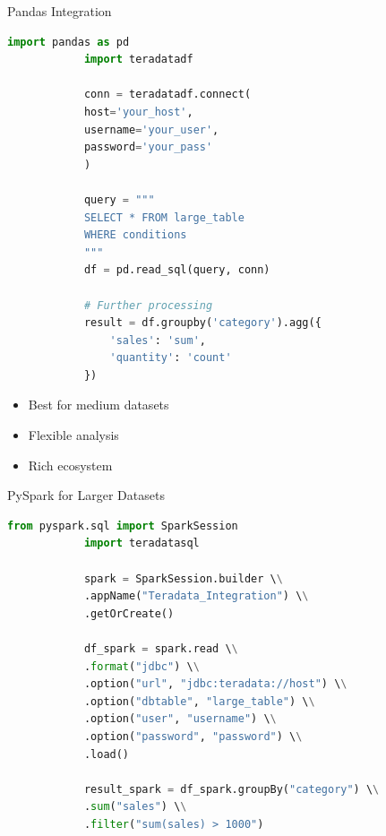 \documentclass{beamer}
\begin{document}
	\begin{frame}[fragile]{Pandas Integration}
		\begin{lstlisting}[language=Python, caption=Extracting to Pandas]
			import pandas as pd
			import teradatadf
			
			conn = teradatadf.connect(
			host='your_host',
			username='your_user',
			password='your_pass'
			)
			
			query = """
			SELECT * FROM large_table
			WHERE conditions
			"""
			df = pd.read_sql(query, conn)
			
			# Further processing
			result = df.groupby('category').agg({
				'sales': 'sum',
				'quantity': 'count'
			})
		\end{lstlisting}
		\begin{itemize}
			\item Best for medium datasets
			\item Flexible analysis
			\item Rich ecosystem
		\end{itemize}
	\end{frame}
	
	\begin{frame}[fragile]{PySpark for Larger Datasets}
		\begin{lstlisting}[language=Python, caption=PySpark Integration]
			from pyspark.sql import SparkSession
			import teradatasql
			
			spark = SparkSession.builder \\
			.appName("Teradata_Integration") \\
			.getOrCreate()
			
			df_spark = spark.read \\
			.format("jdbc") \\
			.option("url", "jdbc:teradata://host") \\
			.option("dbtable", "large_table") \\
			.option("user", "username") \\
			.option("password", "password") \\
			.load()
			
			result_spark = df_spark.groupBy("category") \\
			.sum("sales") \\
			.filter("sum(sales) > 1000")
		\end{lstlisting}
	\end{frame}
	
\end{document}
